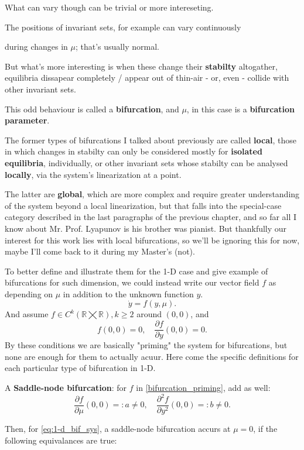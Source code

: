 What can vary though can be trivial or more intereseting.

The positions of invariant sets, for example can vary continuously

during changes in $\mu$; that's usually normal.

But what's more interesting is when these change their \textbf{stabilty} altogather, equilibria dissapear completely / appear out of thin-air - or, even - collide with other invariant sets.

This odd behaviour is called a \textbf{bifurcation}, and $\mu$, in this case is a \textbf{bifurcation parameter}.

The former types of bifurcations I talked about previously are called \textbf{local}, those in which changes in stabilty can only be considered mostly for \textbf{isolated equilibria}, individually, or other invariant sets whose stabilty can be analysed \textbf{locally}, via the system's linearization at a point.

The latter are \textbf{global}, which are more complex and require greater understanding of the system beyond a local linearization, but that falls into the special-case category described in the last paragraphs of the previous chapter, and so far all I know about Mr. Prof. Lyapunov is his brother was pianist. But thankfully our interest for this work lies with local bifurcations, so we'll be ignoring this for now, maybe I'll come back to it during my Master's (not).

To better define and illustrate them for the 1-D case and give example of bifurcations for such dimension, we could instead write our vector field $f$ as depending on $\mu$ in addition to the unknown function $y$.
\begin{equation}\label{eq:1-d_bif_sys}
  \dot{y} = f(y, \mu).
\end{equation}
And assume $f \in C^k(\mathbb{R} \bigtimes \mathbb{R}), k \geq 2 $ around $(0,0)$, and
\begin{equation}\label{bifurcation_priming}
  f(0,0) = 0, \quad \frac{\partial f}{\partial y}(0,0) = 0.
\end{equation}
By these conditions we are basically "priming" the system for bifurcations, but none are enough for them to actually acuur. Here come the specific definitions for each particular type of bifurcation in 1-D.

\begin{definition}
  A \textbf{Saddle-node bifurcation}:
  for $f$ in \ref{bifurcation_priming}, add as well:
  \begin{equation*}
    \frac{\partial f}{\partial \mu}(0,0) =: a \neq 0, \quad \frac{\partial^2 f}{\partial y^2}(0,0) =:b \neq 0.
  \end{equation*}
\end{definition}
Then, for \ref{eq:1-d_bif_sys}, a saddle-node bifurcation accurs at $\mu = 0$, if the following equivalances are true:

